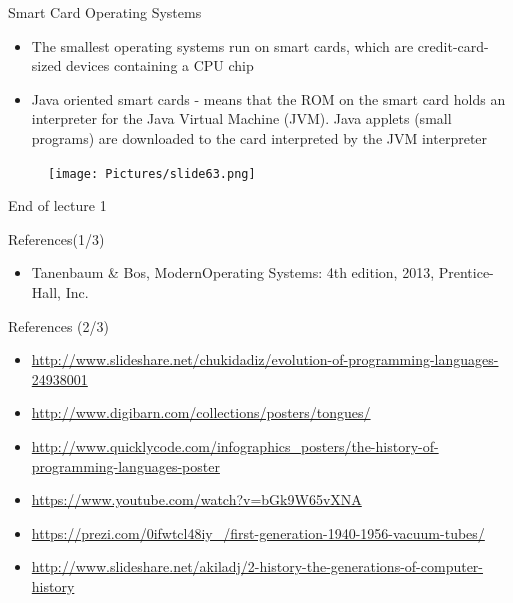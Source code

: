 \documentclass{beamer}
\begin{document}
\begin{frame}
{\centerline{Smart Card Operating Systems}}
\begin{itemize}
    \item The smallest operating systems run on smart cards, which are credit-card-sized devices  containing a CPU chip
    \item Java oriented smart cards - means that the ROM on the smart card holds an interpreter for the Java Virtual Machine (JVM). Java applets (small programs) are downloaded to the card interpreted by the JVM interpreter
\end{itemize}
\begin{figure}
    \centering
    \texttt{[image: Pictures/slide63.png]}
\end{figure}
\end{frame}

\begin{frame}
\Large{\centerline{End of lecture 1}}
\end{frame}

\begin{frame}
{\centerline{References(1/3)}}
\begin{itemize}
    \item Tanenbaum & Bos, ModernOperating Systems: 4th edition, 2013, Prentice-Hall,
Inc. \\
\end{itemize}
\end{frame}

\begin{frame}
{\centerline{References (2/3)}}
\begin{itemize}
\item \url{http://www.slideshare.net/chukidadiz/evolution-of-programming-languages-24938001} \\
\item \url{http://www.digibarn.com/collections/posters/tongues/} \\
\item \url{http://www.quicklycode.com/infographics\_posters/the-history-of-programming-languages-poster} \\
\item \url{https://www.youtube.com/watch?v=bGk9W65vXNA} \\
\item \url{https://prezi.com/0ifwtcl48iy\_/first-generation-1940-1956-vacuum-tubes/} \\
\item \url{http://www.slideshare.net/akiladj/2-history-the-generations-of-computer-history} \\
\end{itemize}
\end{frame}
\end{document}
